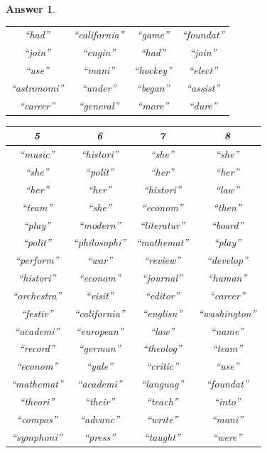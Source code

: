 \documentclass[12pt]{article}
\theoremstyle{colon}
\newtheorem*{answer}{Answer}
\begin{document}
\begin{answer}
\begin{enumerate}[label=\arabic*)]
\begin{center}
\begin{tabular}{ c | c | c | c }
          ``had''       & ``california''& ``game''   & ``foundat''    \\
          ``join''      & ``engin''     & ``had''    & ``join''       \\
          ``use''       & ``mani''      & ``hockey'' & ``elect''      \\
          ``astronomi'' & ``under''     & ``began''  & ``assist''     \\
          ``career''    & ``general''   & ``more''   & ``dure''
        \end{tabular}
        \begin{tabular}{ c | c | c | c }
          5 & 6 & 7 & 8 \\
          \hline
          ``music''     & ``histori''   & ``she''       & ``she''        \\
          ``she''       & ``polit''     & ``her''       & ``her''        \\
          ``her''       & ``her''       & ``histori''   & ``law''        \\
          ``team''      & ``she''       & ``econom''    & ``then''       \\
          ``play''      & ``modern''    & ``literatur'' & ``board''      \\
          ``polit''     & ``philosophi''& ``mathemat''  & ``play''       \\
          ``perform''   & ``war''       & ``review''    & ``develop''    \\
          ``histori''   & ``econom''    & ``journal''   & ``human''      \\
          ``orchestra'' & ``visit''     & ``editor''    & ``career''     \\
          ``festiv''    & ``california''& ``englisn''   & ``washington'' \\
          ``academi''   & ``european''  & ``law''       & ``name''       \\
          ``record''    & ``german''    & ``theolog''   & ``team''       \\
          ``econom''    & ``yale''      & ``critic''    & ``use''        \\
          ``mathemat''  & ``academi''   & ``languag''   & ``foundat''    \\
          ``theori''    & ``their''     & ``teach''     & ``into''       \\
          ``compos''    & ``advanc''    & ``write''     & ``mani''       \\
          ``symphoni''  & ``press''     & ``taught''    & ``were''       \\

\end{tabular}
\end{center}
\end{enumerate}
\end{answer}
\end{document}
